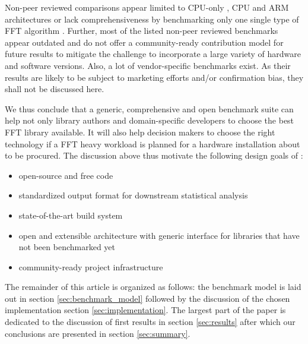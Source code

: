 Non-peer reviewed comparisons appear limited to CPU-only \citep{benchFFT}, CPU and ARM architectures \citep{roy_longbottom} or lack comprehensiveness by benchmarking only one single type of FFT algorithm \citep{fft_check}. Further, most of the listed non-peer reviewed benchmarks appear outdated and do not offer a community-ready contribution model for future results to mitigate the challenge to incorporate a large variety of hardware and software versions. Also, a lot of vendor-specific benchmarks exist. As their results are likely to be subject to marketing efforts and/or confirmation bias, they shall not be discussed here.

We thus conclude that a generic, comprehensive and open benchmark suite can help not only library authors and domain-specific developers to choose the best FFT library available. It will also help decision makers to choose the right technology if a FFT heavy workload is planned for a hardware installation about to be procured. The discussion above thus motivate the following design goals of \gearshifft{}:

\begin{itemize}
\item open-source and free code
\item standardized output format for downstream statistical analysis
\item state-of-the-art build system
\item open and extensible architecture with generic interface for libraries that have not been benchmarked yet
\item community-ready project infrastructure
\end{itemize}

The remainder of this article is organized as follows: the benchmark model is laid out in section \ref{sec:benchmark_model} followed by the discussion of the chosen implementation section \ref{sec:implementation}. The largest part of the paper is dedicated to the discussion of first results in section \ref{sec:results} after which our conclusions are presented in section \ref{sec:summary}.



%
